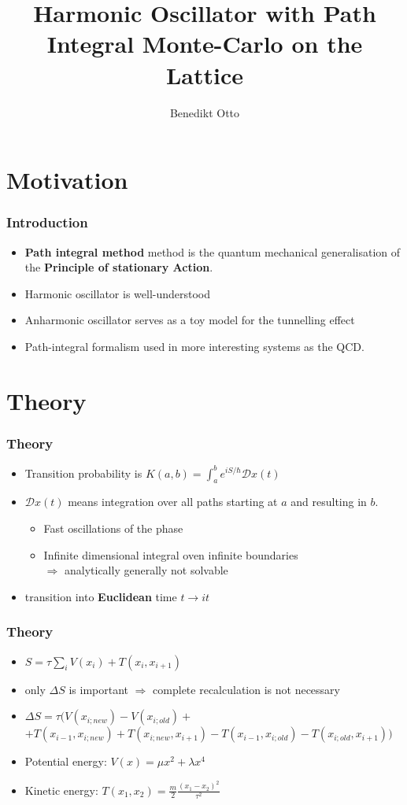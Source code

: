 \documentclass[aspectratio=169]{beamer}
\title[Harmonic Oscillator]{Harmonic Oscillator with Path Integral Monte-Carlo on the Lattice}
\author{Benedikt Otto}
\date{\printdate{31.03.2020}}
\institute{physics760: Computational Physics}
\begin{document}
\begin{frame}
	\titlepage
\end{frame}


\section{Motivation}
\begin{frame}
	\frametitle{Introduction}
	\begin{itemize}
		\item \textbf{Path integral method} method is the quantum mechanical generalisation of the \textbf{Principle of stationary Action}.
		\item Harmonic oscillator is well-understood
		\item Anharmonic oscillator serves as a toy model for the tunnelling effect
		\item Path-integral formalism used in more interesting systems as the QCD.
	\end{itemize}
\end{frame}

\section{Theory}
\begin{frame}
	\frametitle{Theory}
	\begin{itemize}
		\item Transition probability is $K(a, b) = \int_a^b e^{iS/\hbar} \mathcal Dx(t)$
		\item $\mathcal Dx(t)$ means integration over all paths starting at $a$ and resulting in $b$.
		\begin{itemize}
			\item Fast oscillations of the phase
			\item Infinite dimensional integral oven infinite boundaries
			\\ $\Rightarrow$ analytically generally not solvable
		\end{itemize}
		\item transition into \textbf{Euclidean} time $t \rightarrow it$
	\end{itemize}
\end{frame}

\begin{frame}
	\frametitle{Theory}
	\begin{itemize}
		\item $S = \tau \sum_i {V(x_i) + T(x_i, x_{i+1})}$
		\item only $\Delta S$ is important $\Rightarrow$ complete recalculation is not necessary
		\item $\Delta S = \tau (V(x_{i;new}) - V(x_{i;old}) + $\\$ + T(x_{i-1}, x_{i;new}) + T(x_{i;new}, x_{i+1}) - T(x_{i-1}, x_{i;old}) - T(x_{i;old}, x_{i+1}))$
		\item Potential energy: $V(x) = \mu x^2 + \lambda x^4$
		\item Kinetic energy: $T(x_1, x_2) = \frac m2 \frac{(x_1 - x_2)^2}{\tau^2}$
	\end{itemize}
\end{frame}
\end{document}

